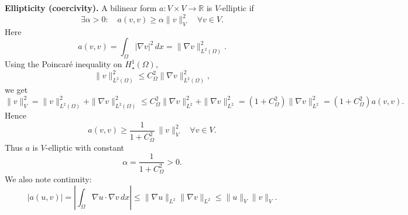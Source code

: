 \textbf{Ellipticity (coercivity).}
A bilinear form $a:V\times V \to \mathbb{R}$ is $V$-elliptic if
\[
    \exists \alpha>0:\quad a(v,v) \ge \alpha \|v\|_V^2 \quad \forall v\in V.
\]
Here
\[
    a(v,v) = \int_\Omega |\nabla v|^2\,dx = \|\nabla v\|_{L^2(\Omega)}^2.
\]
Using the Poincar\'e inequality on $H^1_\star(\Omega)$,
\[
    \|v\|_{L^2(\Omega)}^2 \le C_\Omega^2 \|\nabla v\|_{L^2(\Omega)}^2,
\]
we get
\[
    \|v\|_V^2
    = \|v\|_{L^2(\Omega)}^2 + \|\nabla v\|_{L^2(\Omega)}^2
    \le C_\Omega^2 \|\nabla v\|_{L^2}^2 + \|\nabla v\|_{L^2}^2
    = (1 + C_\Omega^2)\|\nabla v\|_{L^2}^2
    = (1 + C_\Omega^2)a(v,v).
\]
Hence
\[
    a(v,v) \ge \frac{1}{1 + C_\Omega^2}\,\|v\|_V^2
    \quad \forall v\in V.
\]
Thus $a$ is $V$-elliptic with constant
\[
    \alpha = \frac{1}{1+C_\Omega^2}>0.
\]
We also note continuity:
\[
    |a(u,v)| = \left|\int_\Omega \nabla u\cdot\nabla v\,dx\right|
    \le \|\nabla u\|_{L^2}\|\nabla v\|_{L^2}
    \le \|u\|_V \|v\|_V.
\]

